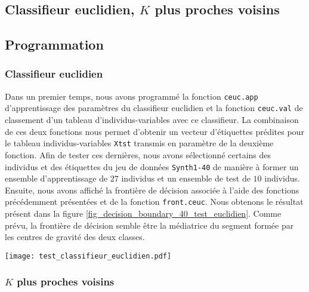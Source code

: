 \documentclass{article}
\begin{document}

\begin{multicols}{2} %

\section{Classifieur euclidien, $K$ plus proches voisins}
\label{sec_classifieur_euclidien}

\subsection{Programmation}
\label{subsec_programmation}

\subsubsection{Classifieur euclidien}
\label{subsubsec_classifieur_euclidien}

Dans un premier temps, nous avons programmé la fonction \texttt{ceuc.app} d'apprentissage des paramètres du classifieur euclidien et la fonction \texttt{ceuc.val} de classement d'un tableau d'individus-variables avec ce classifieur. La combinaison de ces deux fonctions nous permet d'obtenir un vecteur d'étiquettes prédites pour le tableau individus-variables \texttt{Xtst} transmis en paramètre de la deuxième fonction. Afin de tester ces dernières, nous avons sélectionné certains des individus et des étiquettes du jeu de données \texttt{Synth1-40} de manière à former un ensemble d'apprentissage de $27$ individus et un ensemble de test de $10$  individus. Ensuite, nous avons affiché la frontière de décision associée à l'aide des fonctions précédemment présentées et de la fonction \texttt{front.ceuc}. Nous obtenons le résultat présent dans la figure \ref{fig_decision_boundary_40_test_euclidien}. Comme prévu, la frontière de décision semble être la médiatrice du segment formée par les centres de gravité des deux classes.

\begingroup
   \centering
   \texttt{[image: test\_classifieur\_euclidien.pdf]}
     \label{fig_decision_boundary_40_test_euclidien}
\endgroup

\subsubsection{$K$ plus proches voisins}
\label{subsubsec_k_plus_proches_voisins}


\end{multicols}
\end{document}
